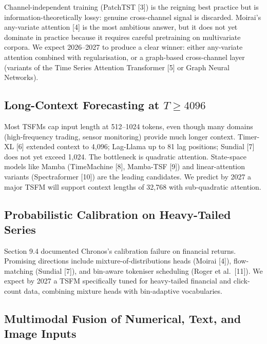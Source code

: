 \documentclass{article}
\begin{document}
Channel-independent training (PatchTST {[}3{]}) is the reigning best practice but is information-theoretically lossy: genuine cross-channel signal is discarded. Moirai's any-variate attention {[}4{]} is the most ambitious answer, but it does not yet dominate in practice because it requires careful pretraining on multivariate corpora. We expect 2026--2027 to produce a clear winner: either any-variate attention combined with regularisation, or a graph-based cross-channel layer (variants of the Time Series Attention Transformer {[}5{]} or Graph Neural Networks).

\subsection{\texorpdfstring{Long-Context Forecasting at \(T \geq 4096\)}{Long-Context Forecasting at T \textbackslash geq 4096}}\label{long-context-forecasting-at-t-geq-4096}

Most TSFMs cap input length at 512--1024 tokens, even though many domains (high-frequency trading, sensor monitoring) provide much longer context. Timer-XL {[}6{]} extended context to 4,096; Lag-Llama up to 81 lag positions; Sundial {[}7{]} does not yet exceed 1,024. The bottleneck is quadratic attention. State-space models like Mamba (TimeMachine {[}8{]}, Mamba-TSF {[}9{]}) and linear-attention variants (Spectraformer {[}10{]}) are the leading candidates. We predict by 2027 a major TSFM will support context lengths of 32,768 with sub-quadratic attention.

\subsection{Probabilistic Calibration on Heavy-Tailed Series}\label{probabilistic-calibration-on-heavy-tailed-series}

Section 9.4 documented Chronos's calibration failure on financial returns. Promising directions include mixture-of-distributions heads (Moirai {[}4{]}), flow-matching (Sundial {[}7{]}), and bin-aware tokeniser scheduling (Roger et al.~{[}11{]}). We expect by 2027 a TSFM specifically tuned for heavy-tailed financial and click-count data, combining mixture heads with bin-adaptive vocabularies.

\subsection{Multimodal Fusion of Numerical, Text, and Image Inputs}\label{multimodal-fusion-of-numerical-text-and-image-inputs}
\end{document}

